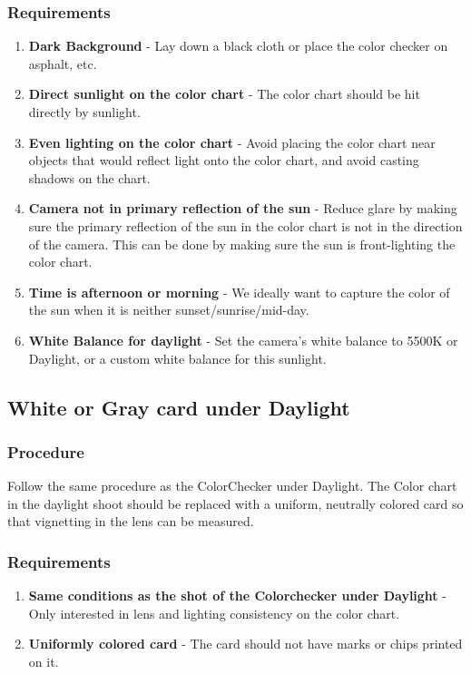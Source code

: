 \documentclass[twoside]{article}
\begin{document}
\subsubsection{Requirements}
\begin{enumerate}
    \item \textbf{Dark Background} - Lay down a black cloth or place the color checker on asphalt, etc.
    \item \textbf{Direct sunlight on the color chart} - The color chart should be hit directly by sunlight.
    \item \textbf{Even lighting on the color chart} - Avoid placing the color chart near objects that would reflect light onto the color chart, and avoid casting shadows on the chart.
    \item \textbf{Camera not in primary reflection of the sun} - Reduce glare by making sure the primary reflection of the sun in the color chart is not in the direction of the camera. This can be done by making sure the sun is front-lighting the color chart.
    \item \textbf{Time is afternoon or morning} - We ideally want to capture the color of the sun when it is neither sunset/sunrise/mid-day.
    \item \textbf{White Balance for daylight} - Set the camera's white balance to 5500K or Daylight, or a custom white balance for this sunlight.
\end{enumerate}

\subsection{White or Gray card under Daylight}
\subsubsection{Procedure}
Follow the same procedure as the ColorChecker under Daylight. The Color chart in the daylight shoot should be replaced with a uniform, neutrally colored card so that vignetting in the lens can be measured.

\subsubsection{Requirements}
\begin{enumerate}
    \item \textbf{Same conditions as the shot of the Colorchecker under Daylight} - Only interested in lens and lighting consistency on the color chart.
    \item \textbf{Uniformly colored card} - The card should not have marks or chips printed on it.
\end{enumerate}

\end{document}
